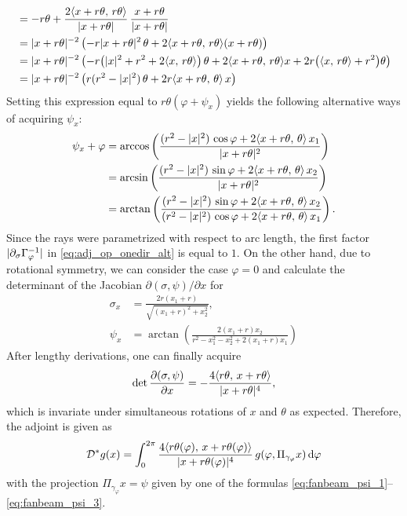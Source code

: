 \documentclass{amsart}
\renewcommand*{\phi}{\varphi}
\begin{document}
\begin{example}
\begin{align*}
  &= -r \theta + \frac{2 \langle x + r \theta,\,r \theta\rangle}{|x + r \theta|}\, \frac{x + r\theta}{|x + r \theta|} \\
  &= |x + r \theta|^{-2} \left(-r |x + r\theta|^2\, \theta  + 2 \langle x + r \theta,\,r \theta\rangle (x + r\theta)\right) \\
  &= |x + r \theta|^{-2} \left(-r \big(|x|^2 + r^2 + 2\langle x,\,r\theta\rangle\big)\, \theta  +
  2 \langle x + r \theta,\,r \theta\rangle x + 2r \big(\langle x,\,r \theta\rangle + r^2\big)\theta \right) \\
  &= |x + r\theta|^{-2} \left(r(r^2 - |x|^2)\, \theta + 2r \langle x + r\theta,\,\theta\rangle\, x \right)
 \end{align*}
 Setting this expression equal to $r\theta(\phi + \psi_x)$ yields the following alternative ways of acquiring $\psi_x$:
 \begin{align}
  \psi_x + \phi
  \label{eq:fanbeam_psi_1}
  &= \arccos\left(\frac{(r^2 - \ABS{x}^2)\, \cos\phi + 2 \INNER{x + r\theta}{\theta}\, x_1}{\ABS{x + r\theta}^2} \right) \\
  \label{eq:fanbeam_psi_2}
  &= \arcsin\left(\frac{(r^2 - \ABS{x}^2)\, \sin\phi + 2 \INNER{x + r\theta}{\theta}\, x_2}{\ABS{x + r\theta}^2} \right) \\
  \label{eq:fanbeam_psi_3}
  &= \arctan\left(\frac{(r^2 - \ABS{x}^2)\, \sin\phi + 2 \INNER{x + r\theta}{\theta}\, x_2}{
  (r^2 - \ABS{x}^2)\, \cos\phi + 2 \INNER{x + r\theta}{\theta}\, x_1} \right).
 \end{align}
 Since the rays were parametrized with respect to arc length, the first factor $\ABS{\partial_\sigma\Gamma_\phi^{-1}}$ in 
 \eqref{eq:adj_op_onedir_alt} is equal to $1$. On the other hand, due to rotational symmetry, we can consider the case $\phi=0$ and 
 calculate  the determinant of the Jacobian $\partial(\sigma,\psi)/\partial x$ for
 \begin{align*}
  \sigma_x &= \frac{2r (x_1 + r)}{\sqrt{(x_1 + r)^2 + x_2^2}}, \\
  \psi_x &= \arctan\left(\frac{2 (x_1 + r) x_2}{r^2 - x_1^2 - x_2^2 + 2 (x_1 + r) x_1} \right)
 \end{align*}
 After lengthy derivations, one can finally acquire
 \begin{equation*}
  \operatorname*{det} \frac{\partial(\sigma,\psi)}{\partial x} = - \frac{4 \langle r\theta,\,x+r\theta\rangle}{|x+r\theta|^4},
 \end{equation*}
 which is invariate under simultaneous rotations of $x$ and $\theta$ as expected. Therefore, the adjoint is given as
 \begin{equation}
  \OPD^* g(x) = \int_0^{2\pi} \frac{4 \INNER{r\theta(\phi)}{x+r\theta(\phi)}}{\ABS{x+r\theta(\phi)}^4}\, g(\phi, \Pi_{\gamma_\phi}x) \, \D 
\phi
 \end{equation} 
 with the projection $\Pi_{\gamma_\phi}x = \psi$ given by one of the formulas \eqref{eq:fanbeam_psi_1}--\eqref{eq:fanbeam_psi_3}.

\end{example}
\end{document}
